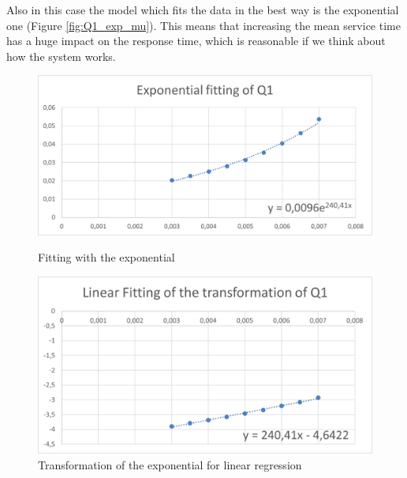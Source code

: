\documentclass{article}
\begin{document}
                    Also in this case the model which fits the data in the best way is the exponential one (Figure \ref{fig:Q1_exp_mu}). This means that increasing the mean service time has a huge impact on the response time, which is reasonable if we think about how the system works.           
                    \begin{figure}[htbp!]
                        \centering
                        \begin{minipage}[c]{.40\textwidth}
                            \centering
                            \includegraphics[width=\textwidth]{./data_analysis/Q1_exp_mu.png}
                            \caption{Fitting with the exponential}
                            \label{fig:Q1_exp_mu}
                        \end{minipage}
                        \hspace{10mm}
                        \begin{minipage}[c]{.40\textwidth}
                            \centering
                            \includegraphics[width=\textwidth]{./data_analysis/Q1_lin_mu.png}
                            \caption{Transformation of the exponential for linear regression}
                            \label{fig:Q1_lin_mu}
                        \end{minipage}
                    \end{figure}
                    
\end{document}
